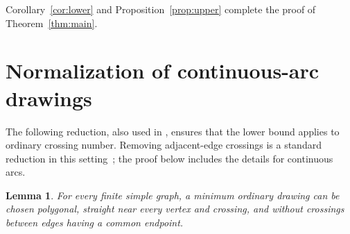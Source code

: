 \documentclass[11pt,a4paper]{article}
\newtheorem{lemma}[theorem]{Lemma}
\theoremstyle{remark}
\numberwithin{equation}{section}
\begin{document}
Corollary~\ref{cor:lower} and Proposition~\ref{prop:upper}
complete the proof of Theorem~\ref{thm:main}.

\appendix
\section{Normalization of continuous-arc drawings}\label{sec:normalization}

The following reduction, also used in \cite[Appendix~A]{BipartiteCompanion},
ensures that the lower bound applies to ordinary crossing number.
Removing adjacent-edge crossings is a standard reduction in this
setting~\cite{FulekEtAl2012}; the proof below includes the details
for continuous arcs.

\begin{lemma}\label{lem:normalization}
For every finite simple graph, a minimum ordinary drawing can be
chosen polygonal, straight near every vertex and crossing, and
without crossings between edges having a common endpoint.
\end{lemma}
\end{document}
